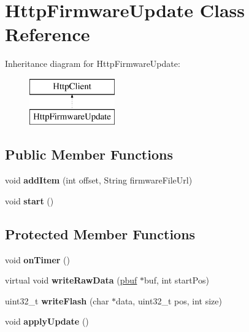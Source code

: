 \hypertarget{class_http_firmware_update}{}\section{Http\+Firmware\+Update Class Reference}
\label{class_http_firmware_update}
Inheritance diagram for Http\+Firmware\+Update\+:\begin{figure}[H]
\begin{center}
\leavevmode
\includegraphics[height=2.000000cm]{class_http_firmware_update}
\end{center}
\end{figure}
\subsection*{Public Member Functions}
\begin{DoxyCompactItemize}
\item 
\hypertarget{class_http_firmware_update_a9308f2da7166cf51d62c01fddd9d3d1a}{}void {\bfseries add\+Item} (int offset, String firmware\+File\+Url)\label{class_http_firmware_update_a9308f2da7166cf51d62c01fddd9d3d1a}

\item 
\hypertarget{class_http_firmware_update_a9e8cdf39684e797beda0508e87276d6d}{}void {\bfseries start} ()\label{class_http_firmware_update_a9e8cdf39684e797beda0508e87276d6d}

\end{DoxyCompactItemize}
\subsection*{Protected Member Functions}
\begin{DoxyCompactItemize}
\item 
\hypertarget{class_http_firmware_update_a1991f3eabc3b4b8d639a77aab749d653}{}void {\bfseries on\+Timer} ()\label{class_http_firmware_update_a1991f3eabc3b4b8d639a77aab749d653}

\item 
\hypertarget{class_http_firmware_update_af13d1432dbd2e89707ae5e740572f1f2}{}virtual void {\bfseries write\+Raw\+Data} (\hyperlink{structpbuf}{pbuf} $\ast$buf, int start\+Pos)\label{class_http_firmware_update_af13d1432dbd2e89707ae5e740572f1f2}

\item 
\hypertarget{class_http_firmware_update_a4f5e354f43f85f57064d262bff108520}{}uint32\+\_\+t {\bfseries write\+Flash} (char $\ast$data, uint32\+\_\+t pos, int size)\label{class_http_firmware_update_a4f5e354f43f85f57064d262bff108520}

\item 
\hypertarget{class_http_firmware_update_aab35ec18c670859bffedc49b53a63afb}{}void {\bfseries apply\+Update} ()\label{class_http_firmware_update_aab35ec18c670859bffedc49b53a63afb}

\end{DoxyCompactItemize}
